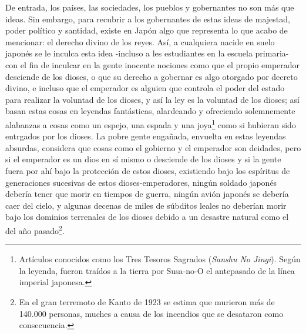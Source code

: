 \documentclass[
]{book}
\begin{document}
De entrada, los países, las sociedades, los pueblos y gobernantes no son más que ideas. Sin embargo, para recubrir a los gobernantes de estas ideas de majestad, poder político y santidad, existe en Japón algo que representa lo que acabo de mencionar: el derecho divino de los reyes. Así, a cualquiera nacide en suelo japonés se le inculca esta idea -incluso a les estudiantes en la escuela primaria- con el fin de inculcar en la gente inocente nociones como que el propio emperador desciende de los dioses, o que su derecho a gobernar es algo otorgado por decreto divino, e incluso que el emperador es alguien que controla el poder del estado para realizar la voluntad de los dioses, y así la ley es la voluntad de los dioses; así basan estas cosas en leyendas fantásticas, alardeando y ofreciendo solemnemente alabanzas a cosas como un espejo, una espada y una joya\footnote{Artículos conocidos como los Tres Tesoros Sagrados (\emph{Sanshu No Jingi}). Según la leyenda, fueron traídos a la
  tierra por Susa-no-O el antepasado de la línea imperial japonesa.} como si hubieran sido entrgados por los dioses. La pobre gente engañada, envuelta en estas leyendas absurdas, considera que cosas como el gobierno y el emperador son deidades, pero si el emperador es un dios en sí mismo o desciende de los dioses y si la gente fuera por ahí bajo la protección de estos dioses, existiendo bajo los espíritus de generaciones sucesivas de estos dioses-emperadores, ningún soldado japonés debería tener que morir en tiempos de guerra, ningún avión japonés se debería caer del cielo, y algunas decenas de miles de súbditos leales no deberían morir bajo los dominios terrenales de los dioses debido a un desastre natural como el del año pasado\footnote{En el gran terremoto de Kanto de 1923 se estima que murieron más de 140.000 personas, muches a causa de los incendios que se desataron como consecuencia.}.
\end{document}
